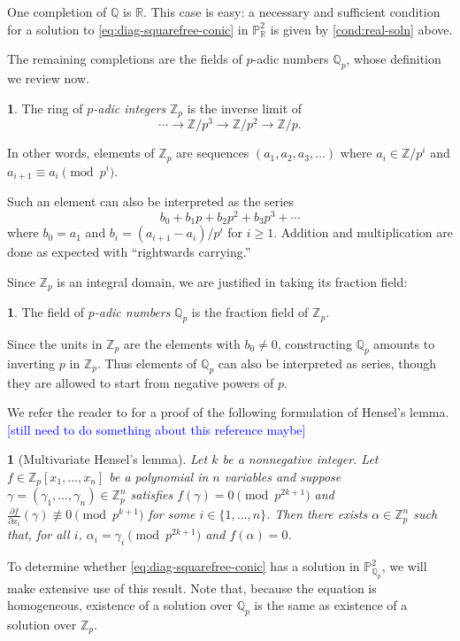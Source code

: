 \documentclass[10pt,a4paper]{amsart}
\numberwithin{equation}{section}
\numberwithin{figure}{section}
\numberwithin{table}{section}
\theoremstyle{definition}
\theoremstyle{plain}
\theoremstyle{remark}
\theoremstyle{plain}
\theoremstyle{definition}
\newtheorem{defn}[thm]{\protect\definitionname}
\theoremstyle{plain}
\theoremstyle{plain}
\newtheorem{lem}[thm]{\protect\lemmaname}
\providecommand{\definitionname}{Definition}
\providecommand{\lemmaname}{Lemma}
\renewcommand{\P}{\mathbb{P}}
\newcommand{\Z}{\mathbb{Z}}
\newcommand{\Q}{\mathbb{Q}}
\newcommand{\R}{\mathbb{R}}
\begin{document}
	One completion of $\Q$ is $\R$. This case is easy: a necessary and sufficient condition for a solution to \eqref{eq:diag-squarefree-conic} in $\P^2_\R$ is given by \eqref{cond:real-soln} above.
	
	The remaining completions are the fields of $p$-adic numbers $\Q_p$, whose definition we review now.
	\begin{defn}
		The ring of \emph{$p$-adic integers} $\Z_p$ is the inverse limit of
		\[
		\cdots \to \Z/p^3 \to \Z/p^2 \to \Z/p.
		\]
	\end{defn}
	In other words, elements of $\Z_p$ are sequences $(a_1,a_2,a_3,\ldots)$ where $a_i \in \Z/p^i$ and $a_{i+1} \equiv a_i \pmod {p^i}$.
	
	Such an element can also be interpreted as the series
	\[
	b_0 + b_1 p + b_2 p^2 + b_3 p^3 + \cdots
	\]
	where $b_0 = a_1$ and $b_i = (a_{i+1} - a_i)/p^i$ for $i \geq 1$. Addition and multiplication are done as expected with ``rightwards carrying.''
	
	Since $\Z_p$ is an integral domain, we are justified in taking its fraction field:
	\begin{defn}
		The field of \emph{$p$-adic numbers} $\Q_p$ is the fraction field of $\Z_p$.
	\end{defn}
	Since the units in $\Z_p$ are the elements with $b_0 \neq 0$, constructing $\Q_p$ amounts to inverting $p$ in $\Z_p$. Thus elements of $\Q_p$ can also be interpreted as series, though they are allowed to start from negative powers of $p$.
	
	We refer the reader to \cite{henselMO} for a proof of the following formulation of Hensel's lemma. \textcolor{blue}{[still need to do something about this reference maybe]}
	\begin{lem}[Multivariate Hensel's lemma]\label{thm:hensels-one-eq}
		Let $k$ be a nonnegative integer. Let $f \in \Z_p[x_1,\ldots,x_n]$ be a polynomial in $n$ variables and suppose $\gamma = (\gamma_1,\ldots,\gamma_n)\in \Z_p^n$ satisfies $f(\gamma) = 0 \pmod {p^{2k+1}}$ and $\frac{\partial f}{\partial x_i}(\gamma) \not\equiv 0 \pmod {p^{k+1}}$ for some $i\in \{1,\ldots,n\}$. Then there exists $\alpha \in \Z_p^n$ such that, for all $i$, $\alpha_i = \gamma_i \pmod {p^{2k+1}}$ and $f(\alpha) = 0$.
	\end{lem}
	To determine whether \eqref{eq:diag-squarefree-conic} has a solution in $\P^2_{\Q_p}$, we will make extensive use of this result. Note that, because the equation is homogeneous, existence of a solution over $\Q_p$ is the same as existence of a solution over $\Z_p$.
	
\end{document}
